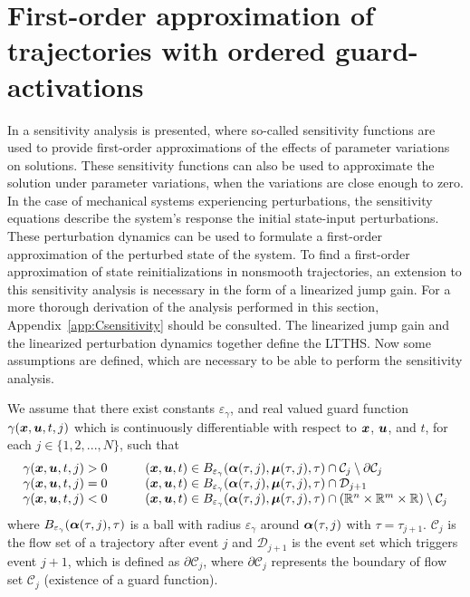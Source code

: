 \documentclass[../DC2017114Bouma.tex]{subfiles}
\begin{document}
\section{First-order approximation of trajectories with ordered guard-activations}\label{sec:3approx}
In \cite{Khalil1996} a sensitivity analysis is presented, where so-called sensitivity functions are used to provide first-order approximations of the effects of parameter variations on solutions. These sensitivity functions can also be used to approximate the solution under parameter variations, when the variations are close enough to zero. In the case of mechanical systems experiencing perturbations, the sensitivity equations describe the system's response the initial state-input perturbations. These perturbation dynamics can be used to formulate a first-order approximation of the perturbed state of the system. To find a first-order approximation of state reinitializations in nonsmooth trajectories, an extension to this sensitivity analysis is necessary in the form of a linearized jump gain. For a more thorough derivation of the analysis performed in this section, Appendix~\ref{app:Csensitivity} should be consulted. The linearized jump gain and the linearized perturbation dynamics together define the LTTHS. Now some assumptions are defined, which are necessary to be able to perform the sensitivity analysis.

\begin{myass}\label{ass:existence}
We assume that there exist constants $\varepsilon_\gamma$, and real valued guard function $\gamma({\boldsymbol{x}},{\boldsymbol{u}},t,j)$ which is continuously differentiable with respect to ${\boldsymbol{x}}$, ${\boldsymbol{u}}$, and $t$, for each $j\in \{1,2,...,N\}$, such that
\begin{equation}
\begin{array}{llll}
\gamma({\boldsymbol{x}},{\boldsymbol{u}},t,j) > 0 & &	&({\boldsymbol{x}},{\boldsymbol{u}},t) \in B_{\varepsilon_\gamma}(\boldsymbol{\alpha}(\tau,j),\boldsymbol{\mu}(\tau,j),\tau)\cap \mathcal{C}_j\setminus\partial \mathcal{C}_j\\
\gamma({\boldsymbol{x}},{\boldsymbol{u}},t,j) = 0 & &	&({\boldsymbol{x}},{\boldsymbol{u}},t) \in B_{\varepsilon_\gamma}(\boldsymbol{\alpha}(\tau,j),\boldsymbol{\mu}(\tau,j),\tau)\cap \mathcal{D}_{j+1}\\
\gamma({\boldsymbol{x}},{\boldsymbol{u}},t,j) < 0 & &	&({\boldsymbol{x}},{\boldsymbol{u}},t) \in B_{\varepsilon_\gamma}(\boldsymbol{\alpha}(\tau,j),\boldsymbol{\mu}(\tau,j),\tau)\cap (\mathbb{R}^n \times \mathbb{R}^m \times \mathbb{R})\setminus \mathcal{C}_j
\end{array}
\end{equation}
where $B_{\varepsilon_{\gamma}}(\boldsymbol{\alpha}(\tau,j),\tau)$ is a ball with radius $\varepsilon_{\gamma}$ around $\boldsymbol{\alpha}(\tau,j)$ with $\tau = \tau_{j+1}$. $\mathcal{C}_j$ is the flow set of a trajectory after event $j$ and $\mathcal{D}_{j+1}$ is the event set which triggers event $j+1$, which is defined as $\partial \mathcal{C}_j$, where $\partial \mathcal{C}_j$ represents the boundary of flow set $\mathcal{C}_j$ (existence of a guard function).
\end{myass}
\end{document}
